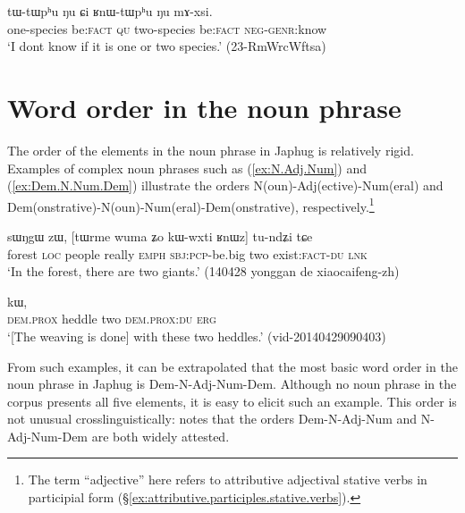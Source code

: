  \begin{exe}
\ex \label{ex:tWtWphu.Nu.Ci}
 \gll tɯ-tɯpʰu ŋu ɕi ʁnɯ-tɯpʰu ŋu mɤ-xsi. \\
 one-species be:\textsc{fact} \textsc{qu} two-species be:\textsc{fact}  \textsc{neg}-\textsc{genr}:know \\
\glt `I dont know if it is one or two species.' (23-RmWrcWftsa) 	
 \end{exe}
 
\section{Word order in the noun phrase} \label{sec:noun.phrases.word.order}
The order of the elements in the noun phrase in Japhug is relatively rigid.  Examples of complex noun phrases such as (\ref{ex:N.Adj.Num}) and (\ref{ex:Dem.N.Num.Dem}) illustrate the orders N(oun)-Adj(ective)-Num(eral) and Dem(onstrative)-N(oun)-Num(eral)-Dem(onstrative), respectively.\footnote{The term ``adjective'' here refers to attributive adjectival stative verbs in participial form (§\ref{ex:attributive.participles.stative.verbs}). } 

\begin{exe}
\ex \label{ex:N.Adj.Num}
 \gll sɯŋgɯ zɯ, [tɯrme wuma ʑo kɯ-wxti ʁnɯz] tu-ndʑi tɕe\\
 forest \textsc{loc} people really \textsc{emph} \textsc{sbj}:\textsc{pcp}-be.big two exist:\textsc{fact}-\textsc{du} \textsc{lnk}\\
 \glt `In the forest, there are two giants.' (140428 yonggan de xiaocaifeng-zh)
\end{exe}

\begin{exe}
\ex \label{ex:Dem.N.Num.Dem}
  kɯ, \\
 \textsc{dem}.\textsc{prox} heddle two \textsc{dem}.\textsc{prox}:\textsc{du} \textsc{erg} \\
 \glt `[The weaving is done] with these two heddles.' (vid-20140429090403)
\end{exe}

From such examples, it can be extrapolated that the most basic word order in the noun phrase in Japhug is Dem-N-Adj-Num-Dem. Although no noun phrase in the corpus presents all five elements, it is easy to elicit such an example. This order is not unusual crosslinguistically: \citet{cinque05universal20} notes that the orders Dem-N-Adj-Num and N-Adj-Num-Dem are both widely attested.

